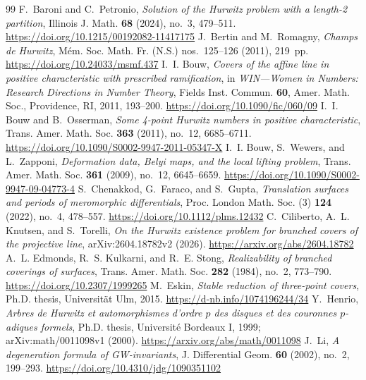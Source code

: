 \documentclass[10pt,a4paper]{amsart}
\numberwithin{equation}{section}
\begin{document}
\begin{thebibliography}{99}
 F.~Baroni and C.~Petronio, \emph{Solution of the Hurwitz problem with a length-2 partition}, Illinois J. Math. \textbf{68} (2024), no.~3, 479--511. \url{https://doi.org/10.1215/00192082-11417175}
 J.~Bertin and M.~Romagny, \emph{Champs de Hurwitz}, M\'em. Soc. Math. Fr. (N.S.) nos.~125--126 (2011), 219~pp. \url{https://doi.org/10.24033/msmf.437}
 I.~I. Bouw, \emph{Covers of the affine line in positive characteristic with prescribed ramification}, in \emph{WIN---Women in Numbers: Research Directions in Number Theory}, Fields Inst. Commun. \textbf{60}, Amer. Math. Soc., Providence, RI, 2011, 193--200. \url{https://doi.org/10.1090/fic/060/09}
 I.~I. Bouw and B.~Osserman, \emph{Some 4-point Hurwitz numbers in positive characteristic}, Trans. Amer. Math. Soc. \textbf{363} (2011), no.~12, 6685--6711. \url{https://doi.org/10.1090/S0002-9947-2011-05347-X}
 I.~I. Bouw, S.~Wewers, and L.~Zapponi, \emph{Deformation data, Belyi maps, and the local lifting problem}, Trans. Amer. Math. Soc. \textbf{361} (2009), no.~12, 6645--6659. \url{https://doi.org/10.1090/S0002-9947-09-04773-4}
 S.~Chenakkod, G.~Faraco, and S.~Gupta, \emph{Translation surfaces and periods of meromorphic differentials}, Proc. London Math. Soc. (3) \textbf{124} (2022), no.~4, 478--557. \url{https://doi.org/10.1112/plms.12432}
 C.~Ciliberto, A.~L. Knutsen, and S.~Torelli, \emph{On the Hurwitz existence problem for branched covers of the projective line}, arXiv:2604.18782v2 (2026). \url{https://arxiv.org/abs/2604.18782}
 A.~L. Edmonds, R.~S. Kulkarni, and R.~E. Stong, \emph{Realizability of branched coverings of surfaces}, Trans. Amer. Math. Soc. \textbf{282} (1984), no.~2, 773--790. \url{https://doi.org/10.2307/1999265}
 M.~Eskin, \emph{Stable reduction of three-point covers}, Ph.D. thesis, Universit\"at Ulm, 2015. \url{https://d-nb.info/1074196244/34}
 Y.~Henrio, \emph{Arbres de Hurwitz et automorphismes d'ordre $p$ des disques et des couronnes $p$-adiques formels}, Ph.D. thesis, Universit\'e Bordeaux I, 1999; arXiv:math/0011098v1 (2000). \url{https://arxiv.org/abs/math/0011098}
 J.~Li, \emph{A degeneration formula of GW-invariants}, J. Differential Geom. \textbf{60} (2002), no.~2, 199--293. \url{https://doi.org/10.4310/jdg/1090351102}

\end{thebibliography}
\end{document}

